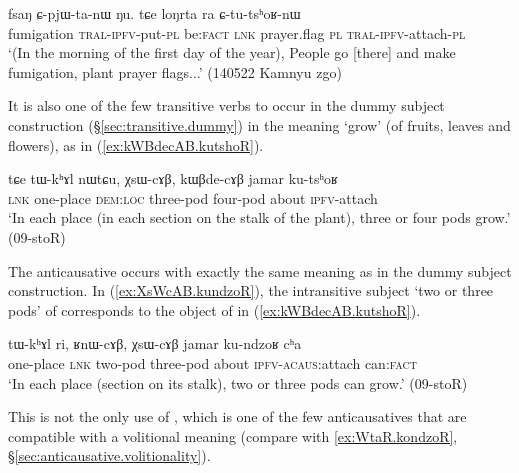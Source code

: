 \begin{exe}
\ex \label{ex:CtutshoRnW}
\gll  fsaŋ ɕ-pjɯ-ta-nɯ ŋu. tɕe loŋrta ra ɕ-tu-tsʰoʁ-nɯ \\
fumigation   \textsc{tral}-\textsc{ipfv}-put-\textsc{pl} be:\textsc{fact} \textsc{lnk} prayer.flag \textsc{pl} \textsc{tral}-\textsc{ipfv}-attach-\textsc{pl} \\
\glt `(In the morning of the first day of the year), People go [there] and make fumigation, plant prayer flags...' (140522 Kamnyu zgo) 
\end{exe}

It is also one of the few transitive verbs to occur in the dummy subject construction (§\ref{sec:transitive.dummy}) in the meaning `grow' (of fruits, leaves and flowers), as in (\ref{ex:kWBdecAB.kutshoR}).

\begin{exe}
\ex \label{ex:kWBdecAB.kutshoR}
\gll tɕe tɯ-kʰɤl nɯtɕu, χsɯ-cɤβ, kɯβde-cɤβ jamar ku-tsʰoʁ \\
\textsc{lnk} one-place \textsc{dem}:\textsc{loc} three-pod four-pod about \textsc{ipfv}-attach \\
\glt `In each place (in each section on the stalk of the plant), three or four pods grow.' (09-stoR) 
\end{exe} 

The anticausative  occurs with exactly the same meaning as  in the dummy subject construction. In (\ref{ex:XsWcAB.kundzoR}), the intransitive subject  `two or three pods' of  corresponds to the object  of  in (\ref{ex:kWBdecAB.kutshoR}).

\begin{exe}
\ex \label{ex:XsWcAB.kundzoR}
\gll tɯ-kʰɤl ri, ʁnɯ-cɤβ, χsɯ-cɤβ jamar ku-ndzoʁ cʰa \\
one-place \textsc{lnk} two-pod  three-pod about \textsc{ipfv}-\textsc{acaus}:attach can:\textsc{fact} \\
\glt `In each place (section on its stalk), two or three pods can grow.' (09-stoR)
\end{exe}

This is not the only use of , which is one of the few anticausatives that are compatible with a volitional meaning (compare with \ref{ex:WtaR.kondzoR}, §\ref{sec:anticausative.volitionality}).



